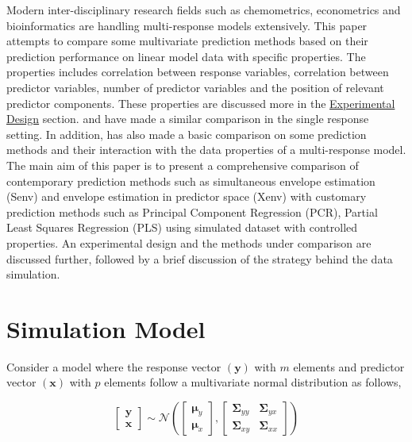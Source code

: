 \documentclass[12pt,3p,authoryear]{elsarticle}
\begin{document}
Modern inter-disciplinary research fields such as chemometrics,
econometrics and bioinformatics are handling multi-response models
extensively. This paper attempts to compare some multivariate prediction
methods based on their prediction performance on linear model data with
specific properties. The properties includes correlation between
response variables, correlation between predictor variables, number of
predictor variables and the position of relevant predictor components.
These properties are discussed more in the
\protect\hyperlink{experimental-design}{Experimental Design} section.
\citet{saebo2015simrel} and \citet{Alm_y_1996} have made a similar
comparison in the single response setting. In addition,
\citet{Rimal2018} has also made a basic comparison on some prediction
methods and their interaction with the data properties of a
multi-response model. The main aim of this paper is to present a
comprehensive comparison of contemporary prediction methods such as
simultaneous envelope estimation (Senv) \citep{cook2015simultaneous} and
envelope estimation in predictor space (Xenv) \citep{cook2010envelope}
with customary prediction methods such as Principal Component Regression
(PCR), Partial Least Squares Regression (PLS) using simulated dataset
with controlled properties. An experimental design and the methods under
comparison are discussed further, followed by a brief discussion of the
strategy behind the data simulation.

\hypertarget{simulation-model}{%
\section{Simulation Model}\label{simulation-model}}

Consider a model where the response vector \((\mathbf{y})\) with \(m\)
elements and predictor vector \((\mathbf{x})\) with \(p\) elements
follow a multivariate normal distribution as follows,

\begin{equation}
  \begin{bmatrix}
    \mathbf{y} \\ \mathbf{x}
  \end{bmatrix} \sim \mathcal{N}
  \left(
    \begin{bmatrix}
      \boldsymbol{\mu}_y \\
      \boldsymbol{\mu}_x
    \end{bmatrix},
    \begin{bmatrix}
    \boldsymbol{\Sigma}_{yy} & \boldsymbol{\Sigma}_{yx} \\
    \boldsymbol{\Sigma}_{xy} & \boldsymbol{\Sigma}_{xx}
    \end{bmatrix}
  \right)
  \label{eq:model-1}
\end{equation}
\end{document}
